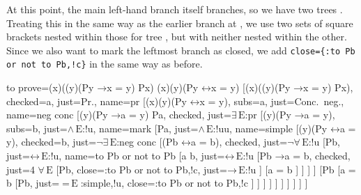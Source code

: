 \documentclass[10pt,british,a4paper]{ltxdoc}
\newcommand*{\lif}{\ensuremath{\mathbin{\rightarrow}}}
\newcommand*{\liff}{\ensuremath{\mathbin{\leftrightarrow}}}
\newcommand*{\elim}{\,\text{E}}
\begin{document}
At this point, the main left-hand branch itself branches, so we have two trees \nyth*{}.
Treating this in the same way as the earlier branch at \nyth[8], we use two sets of square brackets nested within those for tree \nyth{}, but with neither nested within the other.
Since we also want to mark the leftmost branch as closed, we add \verb|close={:to Pb or not to Pb,!c}| in the same way as before.
\begin{latexcode}
\begin{prooftree}
  {
    to prove={(\exists x)((\forall y)(Py \lif x = y) \land Px) \sststile{}{} (\exists x)(\forall y)(Py \liff x = y)}
  }
  [{(\exists x)((\forall y)(Py \lif x = y) \land Px)}, checked=a, just=Pr., name=pr
    [{\lnot (\exists x)(\forall y)(Py \liff x = y)}, subs=a, just=Conc.~neg., name=neg conc
      [{(\forall y)(Py \lif a = y) \land Pa}, checked, just=$\exists\elim$:pr
        [{(\forall y)(Py \lif a = y)}, subs=b, just=$\land\elim$:!u, name=mark
          [Pa, just=$\land\elim$:!uu, name=simple
            [{\lnot (\forall y)(Py \liff a = y)}, checked=b, just=$\lnot\exists\elim$:neg conc
              [{\lnot (Pb \liff a = b)}, checked, just=$\lnot\forall\elim$:!u
                [Pb, just=$\liff\elim$:!u, name=to Pb or not to Pb
                 [a \neq b, just=$\liff\elim$:!u
                  [{Pb \lif a = b}, checked, just=4 $\forall\elim$
                      [\lnot Pb, close={:to Pb or not to Pb,!c}, just=$\lif\elim$:!u
                      ]
                      [{a = b}
                      ]
                  ]
                ]
                ]
                [\lnot Pb
                 [{a = b}
                    [Pb, just={$=\elim$:{simple,!u}}, close={:to Pb or not to Pb,!c}
                    ]
                 ]
                ]
              ]
            ]
          ]
        ]
      ]
    ]
  ]
\end{prooftree}
\end{latexcode}
\end{document}
